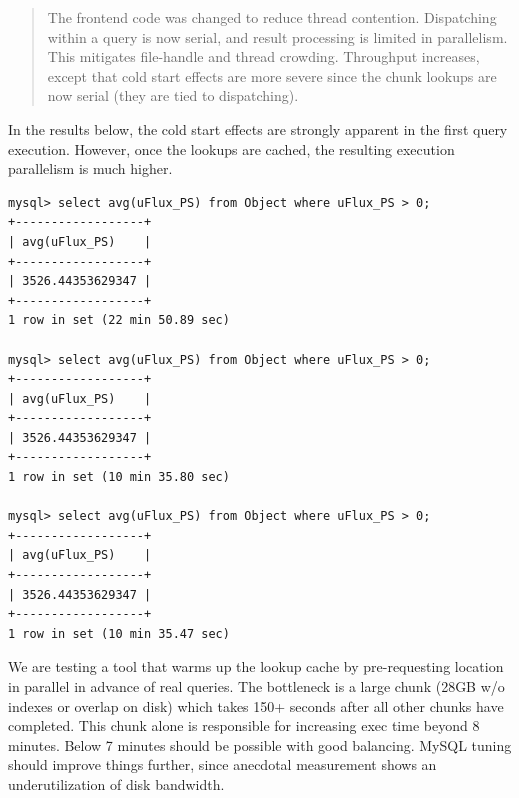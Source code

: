 \documentclass[DM,toc]{lsstdoc}
\begin{document}
\begin{quote}
The frontend code was changed to reduce thread contention. Dispatching within a query is now serial, and result processing is limited in parallelism. This mitigates file-handle and thread crowding. Throughput increases, except that cold start effects are more severe since the chunk lookups are now serial (they are tied to dispatching).
\end{quote}

In the results below, the cold start effects are strongly apparent in
the first query execution. However, once the lookups are cached, the
resulting execution parallelism is much higher.

\begin{verbatim}
mysql> select avg(uFlux_PS) from Object where uFlux_PS > 0;
+------------------+
| avg(uFlux_PS)    |
+------------------+
| 3526.44353629347 |
+------------------+
1 row in set (22 min 50.89 sec)

mysql> select avg(uFlux_PS) from Object where uFlux_PS > 0;
+------------------+
| avg(uFlux_PS)    |
+------------------+
| 3526.44353629347 |
+------------------+
1 row in set (10 min 35.80 sec)

mysql> select avg(uFlux_PS) from Object where uFlux_PS > 0;
+------------------+
| avg(uFlux_PS)    |
+------------------+
| 3526.44353629347 |
+------------------+
1 row in set (10 min 35.47 sec)
\end{verbatim}

We are testing a tool that warms up the lookup cache by pre-requesting
location in parallel in advance of real queries. The bottleneck is a
large chunk (28GB w/o indexes or overlap on disk) which takes 150+
seconds after all other chunks have completed. This chunk alone is
responsible for increasing exec time beyond 8 minutes. Below 7 minutes
should be possible with good balancing. MySQL tuning should improve
things further, since anecdotal measurement shows an underutilization of
disk bandwidth.
\end{document}

